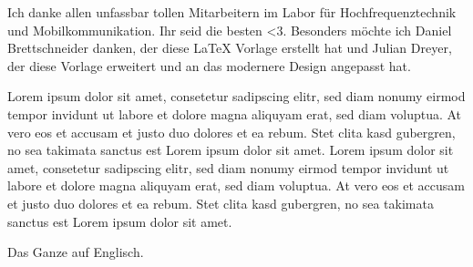 \documentclass[a4paper,12pt,bibliography=totoc]{scrreprt}
\renewcommand{\headrulewidth}{0.0pt}
\begin{document}
\onehalfspacing						%
\pagestyle{plain}					%
\setcounter{page}{1}				%

\label{danksagungen}
Ich danke allen unfassbar tollen Mitarbeitern im Labor für Hochfrequenztechnik und Mobilkommunikation. Ihr seid die besten <3. Besonders möchte ich Daniel Brettschneider danken, der diese LaTeX Vorlage erstellt hat und Julian Dreyer, der diese Vorlage erweitert und an das modernere Design angepasst hat.
\pagebreak


Lorem ipsum dolor sit amet, consetetur sadipscing elitr, sed diam nonumy eirmod tempor invidunt ut labore et dolore magna aliquyam erat, sed diam voluptua. At vero eos et accusam et justo duo dolores et ea rebum. Stet clita kasd gubergren, no sea takimata sanctus est Lorem ipsum dolor sit amet. Lorem ipsum dolor sit amet, consetetur sadipscing elitr, sed diam nonumy eirmod tempor invidunt ut labore et dolore magna aliquyam erat, sed diam voluptua. At vero eos et accusam et justo duo dolores et ea rebum. Stet clita kasd gubergren, no sea takimata sanctus est Lorem ipsum dolor sit amet.

Das Ganze auf Englisch.
\pagebreak

\renewcommand{\headrulewidth}{0.2pt}
\addtocounter{section}{1}

\setcounter{tocdepth}{1}
\tableofcontents
\end{document}
